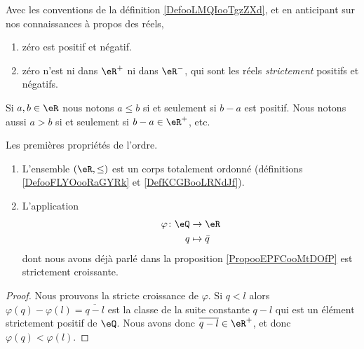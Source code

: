 \begin{remark}
    Avec les conventions de la définition \ref{DefooLMQIooTgzZXd}, et en anticipant sur nos connaissances à propos des réels,
    \begin{enumerate}
        \item
            zéro est positif et négatif.
        \item
            zéro n'est ni dans \( \eR^+\) ni dans \( \eR^-\), qui sont les réels \emph{strictement} positifs et négatifs.
    \end{enumerate}
\end{remark}

\begin{definition}
    Si \( a,b\in \eR\) nous notons \( a\leq b\) si et seulement si \( b-a\) est positif. Nous notons aussi \( a>b\) si et seulement si \( b-a\in \eR^+\), etc.
\end{definition}

\begin{lemma}
    Les premières propriétés de l'ordre.
    \begin{enumerate}
        \item
            L'ensemble \( (\eR,\leq)\) est un corps totalement ordonné (définitions \ref{DefooFLYOooRaGYRk} et \ref{DefKCGBooLRNdJf}).
        \item
            L'application 
            \begin{equation}
                \begin{aligned}
                    \varphi\colon \eQ&\to \eR \\
                    q&\mapsto \bar q 
                \end{aligned}
            \end{equation}
            dont nous avons déjà parlé dans la proposition \ref{PropooEPFCooMtDOfP} est strictement croissante.
    \end{enumerate}
\end{lemma}

\begin{proof}
    Nous prouvons la stricte croissance de \( \varphi\). Si \( q< l\) alors \( \varphi(q)-\varphi(l)=\overline{ q-l }\) est la classe de la suite constante \( q-l\) qui est un élément strictement positif de \( \eQ\). Nous avons donc \( \overline{ q-l }\in \eR^+\), et donc \( \varphi(q)<\varphi(l)\).
\end{proof}

